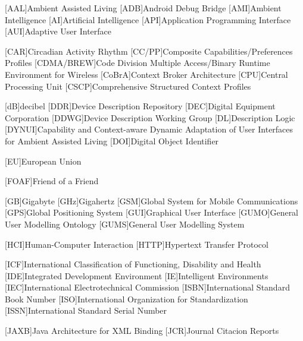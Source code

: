 \begin{acronym}[dynui]
  [AAL]{Ambient Assisted Living}
  [ADB]{Android Debug Bridge}
  [AMI]{Ambient Intelligence} %
  [AI]{Artificial Intelligence}
  [API]{Application Programming Interface}
  [AUI]{Adaptive User Interface}
  
  [CAR]{Circadian Activity Rhythm}
  [CC/PP]{Composite Capabilities/Preferences Profiles}
  [CDMA/BREW]{Code Division Multiple Access/Binary Runtime Environment for Wireless}
  [CoBrA]{Context Broker Architecture}
  [CPU]{Central Processing Unit}
  [CSCP]{Comprehensive Structured Context Profiles}
  
  [dB]{decibel}
  [DDR]{Device Description Repository}
  [DEC]{Digital Equipment Corporation}
  [DDWG]{Device Description Working Group}
  [DL]{Description Logic}
  [DYNUI]{Capability and Context-aware Dynamic Adaptation of User Interfaces for Ambient Assisted Living}
  [DOI]{Digital Object Identifier}
  
  [EU]{European Union}
  
  [FOAF]{Friend of a Friend}
  
  [GB]{Gigabyte}
  [GHz]{Gigahertz}
  [GSM]{Global System for Mobile Communications}
  [GPS]{Global Positioning System}
  [GUI]{Graphical User Interface}
  [GUMO]{General User Modelling Ontology}
  [GUMS]{General User Modelling System}
  
  [HCI]{Human-Computer Interaction}
  [HTTP]{Hypertext Transfer Protocol}
  
  [ICF]{International Classification of Functioning, Disability and Health}
  [IDE]{Integrated Development Environment}
  [IE]{Intelligent Environments}
  [IEC]{International Electrotechnical Commission}
  [ISBN]{International Standard Book Number}
  [ISO]{International Organization for Standardization}
  [ISSN]{International Standard Serial Number}
  
  [JAXB]{Java Architecture for XML Binding}
  [JCR]{Journal Citacion Reports}
  

\end{acronym}
